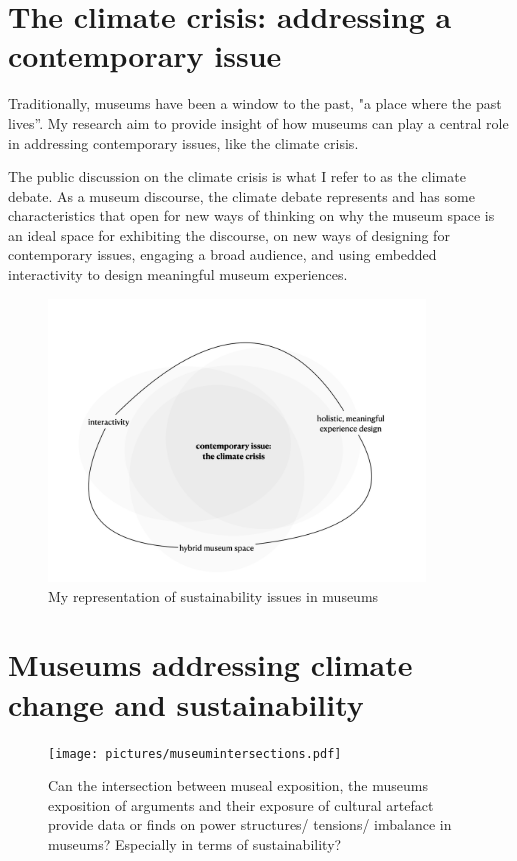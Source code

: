 \section{The climate crisis: addressing a contemporary issue}

Traditionally, museums have been a window to the past, "a place where the past lives”. My research aim to provide insight of how museums can play a central role in addressing contemporary issues, like the climate crisis.

The public discussion on the climate crisis is what I refer to as the climate debate. As a museum discourse, the climate debate represents and has some characteristics that open for new ways of thinking on why the museum space is an ideal space for exhibiting the discourse, on new ways of designing for contemporary issues, engaging a broad audience, and using embedded interactivity to design meaningful museum experiences.

\begin{figure}[h]
\includegraphics[width=10cm]{pictures/problem_sphere.png}
\caption{My representation of sustainability issues in museums}
\centering 
\end{figure}

\section{Museums addressing climate change and sustainability}


\begin{figure}[h]
\texttt{[image: pictures/museumintersections.pdf]}
\caption{Can the intersection between museal exposition, the museums exposition of arguments and their exposure of cultural artefact provide data or finds on power structures/ tensions/ imbalance in museums? Especially in terms of sustainability?}
\centering 
\end{figure}

